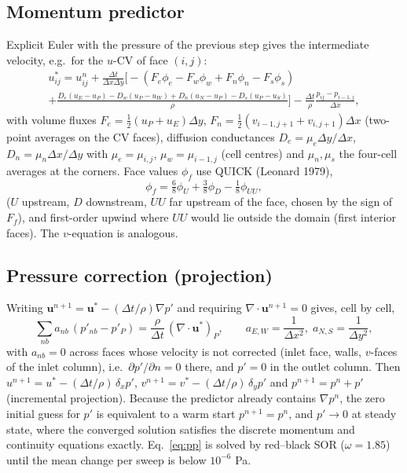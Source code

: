 \subsection{Momentum predictor}
Explicit Euler with the pressure of the previous step gives the intermediate velocity, e.g.\ for the $u$-CV of face $(i,j)$:
\begin{multline}
u^*_{ij}=u^n_{ij}+\frac{\Delta t}{\Delta x\Delta y}\Big[-(F_e\phi_e-F_w\phi_w+F_n\phi_n-F_s\phi_s)\\+\frac{D_e(u_E-u_P)-D_w(u_P-u_W)+D_n(u_N-u_P)-D_s(u_P-u_S)}{\rho}\Big]-\frac{\Delta t}{\rho}\frac{p_{ij}-p_{i-1,j}}{\Delta x},
\end{multline}
with volume fluxes $F_e=\tfrac12(u_P+u_E)\Delta y$, $F_n=\tfrac12(v_{i-1,j+1}+v_{i,j+1})\Delta x$ (two-point averages on the CV faces), diffusion conductances $D_e=\mu_e\Delta y/\Delta x$, $D_n=\mu_n\Delta x/\Delta y$ with $\mu_e=\mu_{i,j}$, $\mu_w=\mu_{i-1,j}$ (cell centres) and $\mu_{n},\mu_s$ the four-cell averages at the corners. Face values $\phi_f$ use QUICK (Leonard 1979),
\begin{equation}
\phi_f=\tfrac68\phi_U+\tfrac38\phi_D-\tfrac18\phi_{UU},
\end{equation}
($U$ upstream, $D$ downstream, $UU$ far upstream of the face, chosen by the sign of $F_f$), and first-order upwind where $UU$ would lie outside the domain (first interior faces). The $v$-equation is analogous.

\subsection{Pressure correction (projection)}
Writing $\mathbf{u}^{n+1}=\mathbf{u}^*-(\Delta t/\rho)\nabla p'$ and requiring $\nabla\cdot\mathbf{u}^{n+1}=0$ gives, cell by cell,
\begin{equation}
\sum_{nb}a_{nb}\,(p'_{nb}-p'_P)=\frac{\rho}{\Delta t}\,(\nabla\cdot\mathbf{u}^*)_P,\qquad a_{E,W}=\frac1{\Delta x^2},\;a_{N,S}=\frac1{\Delta y^2}, \label{eq:pp}
\end{equation}
with $a_{nb}=0$ across faces whose velocity is not corrected (inlet face, walls, $v$-faces of the inlet column), i.e.\ $\partial p'/\partial n=0$ there, and $p'=0$ in the outlet column. Then $u^{n+1}=u^*-(\Delta t/\rho)\,\delta_xp'$, $v^{n+1}=v^*-(\Delta t/\rho)\,\delta_yp'$ and $p^{n+1}=p^n+p'$ (incremental projection). Because the predictor already contains $\nabla p^n$, the zero initial guess for $p'$ is equivalent to a warm start $p^{n+1}=p^n$, and $p'\to0$ at steady state, where the converged solution satisfies the discrete momentum and continuity equations exactly. Eq.~\eqref{eq:pp} is solved by red--black SOR ($\omega=1.85$) until the mean change per sweep is below $10^{-6}$ Pa.

